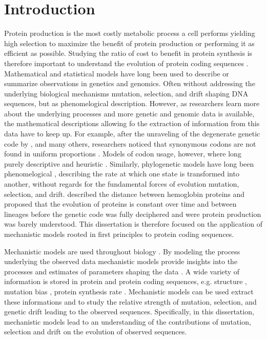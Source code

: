 \chapter{Introduction} 
\label{ch:introduction}

Protein production is the most costly metabolic process a cell performs \citep{buttgereit1995,warner1999,AkashiAndGojobori2002,lindqvist2018} yielding high selection to maximize the benefit of protein production or performing it as efficient as possible.
Studying the ratio of cost to benefit in protein synthesis is therefore important to understand the evolution of protein coding sequences \citep{gilchrist2009,ShahAndGilchrist2011,gilchrist2015,beaulieu2018}.
Mathematical and statistical models have long been used to describe or summarize observations in genetics and genomics.
Often without addressing the underlying biological mechanisms mutation, selection, and drift shaping DNA sequences, but as phenomelogical description.
However, as researchers learn more about the underlying processes and more genetic and genomic data is available, the mathematical descriptions allowing fo the extraction of information from this data have to keep up.
For example, after the unraveling of the degenerate genetic code by \citet{MatthaeiAndNirenberg1961,NirenbergAndMatthaei1961,Maxwell1962,LederAndNirenberg1964}, and many others, researchers noticed that synonymous codons are not found in uniform proportions \citep{fitch1976,grantham1980,ikemura1981,grantham1981,sharp1988}.
Models of codon usage, however, where long purely descriptive and heuristic \citep{ikemura1981,BennetzenAndHall1982,sharp1987,Wright1990}.
Similarly, phylogenetic models have long been phenomelogical \citep{JukesAndCantor1969,Dayhoff1978,Kimura1980,felsenstein1981,Altschul1991}, describing the rate at which one state is transformed into another, without regards for the fundamental forces of evolution mutation, selection, and drift.
\citet{ZuckerkandlAndPauling1962} described the distance between hemoglobin proteins and proposed that the evolution of proteins is constant over time and between lineages before the genetic code was fully deciphered and were protein production was barely understood.
This dissertation is therefore focused on the application of mechanistic models rooted in first principles to protein coding sequences.

Mechanistic models are used throughout biology \citep{GoldmanAndYang1994,loreau1998,DavisAndPelsor2001,adf2007,McGill2007}.
By modeling the process underlying the observed data mechanistic models provide insights into the processes and estimates of parameters shaping the data \citep{Liberles2013}.
A wide variety of information is stored in protein and protein coding sequences, e.g. structure \citep{anfinsen1973}, mutation bias \citep{ShahAndGilchrist2011, gilchrist2015}, protein synthesis rate \citep{gilchrist2007,gilchrist2015}. 
Mechanistic models can be used extract these informations and to study the relative strength of mutation, selection, and genetic drift leading to the observed sequences.
Specifically, in this dissertation, mechanistic models lead to an understanding of the contributions of mutation, selection and drift on the evolution of observed sequences.

